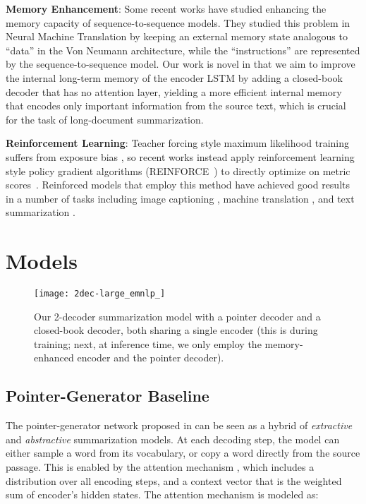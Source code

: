 \documentclass[11pt,a4paper]{article}
\begin{document}
\noindent\textbf{Memory Enhancement}:
Some recent works \cite{Wang:16memory,Xiong:17,Gu:16b} have studied enhancing the memory capacity of sequence-to-sequence models. They studied this problem in Neural Machine Translation by keeping an external memory state analogous to “data” in the Von
Neumann architecture, while the “instructions” are represented by the sequence-to-sequence model. Our work is novel in that we aim to improve the internal long-term memory of the encoder LSTM by adding a closed-book decoder that has no attention layer, yielding a more efficient internal memory that encodes only important information from the source text, which is crucial for the task of long-document summarization.

\noindent\textbf{Reinforcement Learning}: Teacher forcing style maximum likelihood training suffers from exposure bias \cite{Bengio:15}, so recent works instead apply reinforcement learning style policy gradient algorithms (REINFORCE~\cite{Williams:92}) to directly optimize on metric scores~\cite{Henss:15,Paulus:17}. 
Reinforced models that employ this method have achieved good results in a number of tasks including image captioning \cite{Liu:16,Ranzato:16}, machine translation \cite{Bahdanau:16,Norouzi:16}, and text summarization \cite{Ranzato:16,Paulus:17}. 

 \section{Models}

\begin{figure*}[t]
\centering
\texttt{[image: 2dec-large\_emnlp\_]}
\vspace{-10pt} 
\caption{Our 2-decoder summarization model with a pointer decoder and a closed-book decoder, both sharing a single encoder (this is during training; next, at inference time, we only employ the memory-enhanced encoder and the pointer decoder). \label{fig:model} \vspace{-4pt}}
\end{figure*}

\subsection{Pointer-Generator Baseline}
The pointer-generator network proposed in  can be seen as a hybrid of \emph{extractive} and \emph{abstractive} summarization models. At each decoding step, the model can either sample a word from its vocabulary, or copy a word directly from the source passage. 
This is enabled by the attention mechanism \cite{Bahdanau:14}, which includes a distribution  over all encoding steps, and a context vector  that is the weighted sum of encoder's hidden states. 
The attention mechanism is modeled as:
\end{document}
